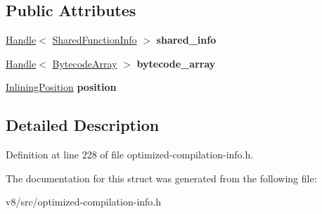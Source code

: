 \subsection*{Public Attributes}
\begin{DoxyCompactItemize}
\item 
\mbox{\label{structv8_1_1internal_1_1OptimizedCompilationInfo_1_1InlinedFunctionHolder_a351debb2cce46bb0b541f12c3c279240}} 
\mbox{\hyperlink{classv8_1_1internal_1_1Handle}{Handle}}$<$ \mbox{\hyperlink{classv8_1_1internal_1_1SharedFunctionInfo}{Shared\+Function\+Info}} $>$ {\bfseries shared\+\_\+info}
\item 
\mbox{\label{structv8_1_1internal_1_1OptimizedCompilationInfo_1_1InlinedFunctionHolder_a4bb656c91432dbaf972122d8e04f6163}} 
\mbox{\hyperlink{classv8_1_1internal_1_1Handle}{Handle}}$<$ \mbox{\hyperlink{classv8_1_1internal_1_1BytecodeArray}{Bytecode\+Array}} $>$ {\bfseries bytecode\+\_\+array}
\item 
\mbox{\label{structv8_1_1internal_1_1OptimizedCompilationInfo_1_1InlinedFunctionHolder_ab2ec7499f0a1c115b6e16936021481df}} 
\mbox{\hyperlink{structv8_1_1internal_1_1InliningPosition}{Inlining\+Position}} {\bfseries position}
\end{DoxyCompactItemize}


\subsection{Detailed Description}


Definition at line 228 of file optimized-\/compilation-\/info.\+h.



The documentation for this struct was generated from the following file\+:\begin{DoxyCompactItemize}
\item 
v8/src/optimized-\/compilation-\/info.\+h\end{DoxyCompactItemize}
